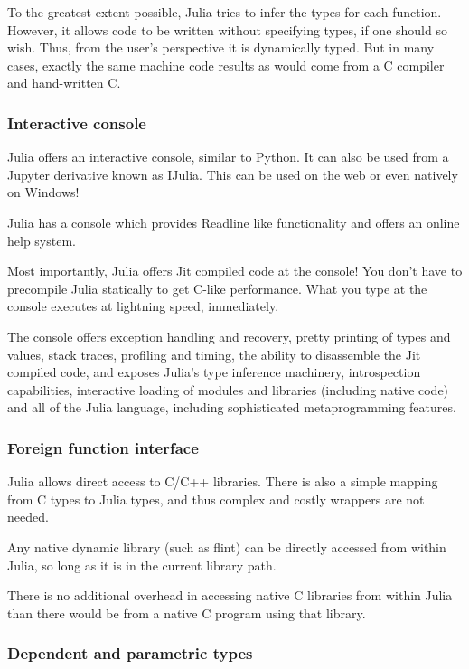 \documentclass[a4paper,10pt]{article}
\begin{document}
To the greatest extent possible, Julia tries to infer the types for each function. However, it
allows code to be written without specifying types, if one should so wish. Thus, from the user's
perspective it is dynamically typed. But in many cases, exactly the same machine code results as
would come from a C compiler and hand-written C. 

\subsubsection{Interactive console}

Julia offers an interactive console, similar to Python. It can also be used from a Jupyter derivative
known as IJulia. This can be used on the web or even natively on Windows!

Julia has a console which provides Readline like functionality and offers an online help 
system.

Most importantly, Julia offers Jit compiled code at the console! You don't have to precompile
Julia statically to get C-like performance. What you type at the console executes at lightning
speed, immediately.

The console offers exception handling and recovery, pretty printing of types and values, stack 
traces, profiling and timing, the ability to disassemble the Jit compiled code, and exposes 
Julia's type inference machinery, introspection capabilities, interactive loading of modules 
and libraries (including native code) and all of the Julia language, including sophisticated 
metaprogramming features. 

\subsubsection{Foreign function interface}

Julia allows direct access to C/C++ libraries. There is also a simple mapping from C types to Julia
types, and thus complex and costly wrappers are not needed.

Any native dynamic library (such as flint) can be directly accessed from within Julia, so long
as it is in the current library path.

There is no additional overhead in accessing native C libraries from within Julia than there
would be from a native C program using that library.

\subsubsection{Dependent and parametric types}
\end{document}
